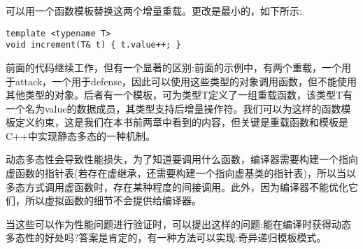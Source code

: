 可以用一个函数模板替换这两个增量重载。更改是最小的，如下所示:

\begin{lstlisting}[style=styleCXX]
template <typename T>
void increment(T& t) { t.value++; }
\end{lstlisting}

前面的代码继续工作，但有一个显著的区别:前面的示例中，有两个重载，一个用于attack，一个用于defense，因此可以使用这些类型的对象调用函数，但不能使用其他类型的对象。后者有一个模板，可为类型T定义了一组重载函数，该类型T有一个名为value的数据成员，其类型支持后增量操作符。我们可以为这样的函数模板定义约束，这是我们在本书前两章中看到的内容，但关键是重载函数和模板是C++中实现静态多态的一种机制。

动态多态性会导致性能损失，为了知道要调用什么函数，编译器需要构建一个指向虚函数的指针表(若存在虚继承，还需要构建一个指向虚基类的指针表)，所以当以多态方式调用虚函数时，存在某种程度的间接调用。此外，因为编译器不能优化它们，所以虚拟函数的细节不会提供给编译器。

当这些可以作为性能问题进行验证时，可以提出这样的问题:能在编译时获得动态多态性的好处吗?答案是肯定的，有一种方法可以实现:奇异递归模板模式。










































